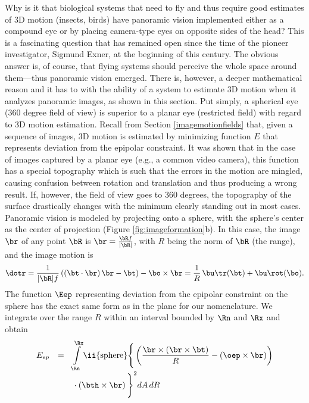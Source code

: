 \documentclass[10pt,twocolumn]{article}
\begin{document}
\label{spherical-vs-planar}
Why is it that biological systems that need to fly and thus require
good estimates of 3D motion (insects, birds)
have panoramic vision implemented either as a compound eye or by
placing camera-type eyes on opposite sides of the head? This is a
fascinating question that has remained open since the time of the
pioneer investigator, Sigmund Exner, at the beginning of this century.
The obvious answer is, of course, that flying systems should perceive
the whole space around them---thus panoramic vision emerged. There is,
however, a deeper mathematical reason  and it has to with the ability of a system
to estimate 3D motion when it analyzes panoramic images, as shown in
this section. Put simply, a
spherical eye (360 degree field of view) is superior to a planar
eye (restricted field) with regard to 3D motion estimation. Recall
from Section \ref{imagemotionfields}
that, given a sequence of images, 3D motion is estimated by minimizing
function $E$ that represents deviation from the epipolar constraint.
It was shown that in the case of images captured by a planar eye
(e.g., a common video camera), this function has a special topography
which is such that the errors in the motion are mingled, causing
confusion between rotation and translation and thus producing a wrong
result. If, however, the field of view goes to 360 degrees, the
topography of the surface drastically changes with the minimum clearly
standing out in most cases. Panoramic vision is modeled by projecting
onto a sphere, with the sphere's center as the center of projection
(Figure \ref{fig:imageformation}b). In this case, the image $\br$ of
any point $\bR$ is $\br = \frac{\bR f}{|\bR |}$, with $R$ being the
norm of $\bR$ (the range), and the image motion is
\begin{equation}
  \label{des2}
  \dotr = \frac{1}{|\bR | f} \left(\left(\bt \cdot \br\right)\br -
  \bt\right) - \bo \times \br = \frac{1}{R}\,\bu\tr(\bt) + \bu\rot
  (\bo).
\end{equation}
The function $\Eep$ representing deviation from the epipolar
constraint on the sphere has the exact same form as in the plane for
our nomenclature. We integrate over the range $R$ within an interval
bounded by $\Rn$ and $\Rx$ and obtain
\begin{displaymath}
  \begin{array}{rcl}
E_{ep} & = & 
\displaystyle \int\limits^{\Rx}_{\Rn}\ii{\rm
  sphere}\Bigg\{\left(\frac{\br \times (\br \times \bt)}{R} -
  \left(\oep \times \br\right)\right) 
\\
& & 
\displaystyle {}\cdot \left(\bth \times
    \br\right)\Bigg\}^2 dA\,dR
  \end{array}
\end{displaymath}
\end{document}
